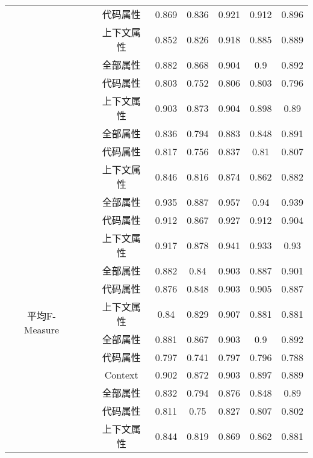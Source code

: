 \begin{table} [htbp]
\begin{tabular}{cccccccc}
&   &代码属性 & 0.869    & 0.836  & 0.921 & 0.912 & 0.896 \\
&   &  上下文属性& 0.852    & 0.826  & 0.918 & 0.885 & 0.889 \\
\cline{2-8}
&~\multirow{3}{*}{jFreeChart} 
 & 全部属性 & 0.882    & 0.868  & 0.904 & 0.9   & 0.892 \\
&  &代码属性 & 0.803    & 0.752  & 0.806 & 0.803 & 0.796 \\
&   &  上下文属性 & 0.903    & 0.873  & 0.904 & 0.898 & 0.89  \\
\cline{2-8}
&~\multirow{3}{*}{Tuxguitar} 
&全部属性 & 0.836    & 0.794  & 0.883 & 0.848 & 0.891 \\
&   &代码属性 & 0.817    & 0.756  & 0.837 & 0.81  & 0.807 \\
&    & 上下文属性& 0.846    & 0.816  & 0.874 & 0.862 & 0.882 \\
\hline
\multirow{12}{*}{平均F-Measure }
&~\multirow{3}{*}{ArgoUML}
& 全部属性 & 0.935    & 0.887  & 0.957 & 0.94  & 0.939 \\
 &  & 代码属性 & 0.912    & 0.867  & 0.927 & 0.912 & 0.904 \\
 &   &  上下文属性& 0.917    & 0.878  & 0.941 & 0.933 & 0.93  \\
\cline{2-8}
&~\multirow{3}{*}{jEdit} 
& 全部属性 & 0.882    & 0.84   & 0.903 & 0.887 & 0.901 \\
&   &代码属性& 0.876    & 0.848  & 0.903 & 0.905 & 0.887 \\
&   &  上下文属性& 0.84     & 0.829  & 0.907 & 0.881 & 0.881 \\
\cline{2-8}
&~\multirow{3}{*}{jFreeChart} 
&  全部属性& 0.881    & 0.867  & 0.903 & 0.9   & 0.892 \\
&  &代码属性 & 0.797    & 0.741  & 0.797 & 0.796 & 0.788 \\
&   & Context & 0.902    & 0.872  & 0.903 & 0.897 & 0.889 \\
\cline{2-8}
&~\multirow{3}{*}{Tuxguitar} 
&全部属性 & 0.832    & 0.794  & 0.876 & 0.848 & 0.89  \\
&  &代码属性& 0.811    & 0.75   & 0.827 & 0.807 & 0.802 \\
&  & 上下文属性& 0.844    & 0.819  & 0.869 & 0.862 & 0.881\\
\bottomrule[1.5pt]
\end{tabular}
\end{table} 


